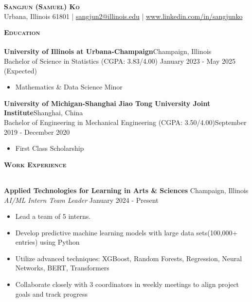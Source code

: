 \documentclass[a4paper]{article}
\newcommand{\lineunder} {
    \vspace*{-8pt} \\
    \hspace*{-18pt} \hrulefill \\
}
\newcommand{\header} [1] {
    {\hspace*{-18pt}\vspace*{6pt} \textsc{#1}}
    \vspace*{-6pt} \lineunder
}
\begin{document}
\vspace*{-40pt}

    

\vspace*{-10pt}
\begin{center}
	{\Huge \scshape \textbf{Sangjun (Samuel) Ko}}\\
    Urbana, Illinois 61801 
    | \href{mailto:sangjun2@illinois.edu}{sangjun2@illinois.edu}
    | \href{https://www.linkedin.com/in/sangjunko}{www.linkedin.com/in/sangjunko}

	  
\end{center}

\header{\textbf{Education}}
\textbf{University of Illinois at Urbana-Champaign}\hfill Champaign, Illinois \\
Bachelor of Science in Statistics (CGPA: 3.83/4.00) \hfill January 2023 - May 2025 (Expected) \\ 
    \begin{itemize}[noitemsep]
        \item Mathematics \& Data Science Minor
    \end{itemize}

\textbf{University of Michigan-Shanghai Jiao Tong University Joint Institute}\hfill Shanghai, China\\
Bachelor of Engineering in Mechanical Engineering (CGPA: 3.50/4.00)\hfill September 2019 - December 2020\\
    \begin{itemize}[noitemsep]
        \item First Class Scholarship
    \end{itemize}

\vspace{2mm}

\header{\textbf{Work Experience}}
\vspace{1mm}


\textbf{Applied Technologies for Learning in Arts \& Sciences}
\hfill Champaign, Illinois\\
\textit{AI/ML Intern Team Leader} \hfill January 2024 - Present\\

    \begin{itemize}[noitemsep]
        \item Lead a team of 5 interns. 
        \item Develop predictive machine learning models with large data sets(100,000+ entries) using Python
        \item Utilize advanced techniques: XGBoost, Random Forests, Regression, Neural Networks, BERT, Transformers
        \item Collaborate closely with 3 coordinators in weekly meetings to align project goals and track progress
    \end{itemize}
    
\end{document}
